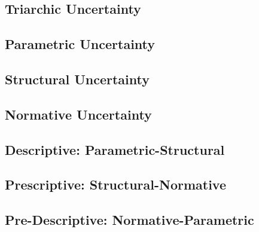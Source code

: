 \subsection{Triarchic Uncertainty}

\subsection{Parametric Uncertainty}

% 
\subsection{Structural Uncertainty}

\subsection{Normative Uncertainty}

\subsection{Descriptive: Parametric-Structural}

\subsection{Prescriptive: Structural-Normative}

\subsection{Pre-Descriptive: Normative-Parametric}

